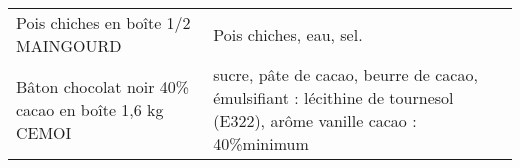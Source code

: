 \begin{longtable}{p{5cm}p{10cm}}
                                                                      Pois chiches en boîte 1/2 MAINGOURD &                                                                                                                                                                                                                                                                                                                                                                                                                                                                                                                                                                                                                                                                                                                                                                                                                                                                                                                                                                                                                  Pois chiches, eau, sel. \\
                                                      Bâton chocolat noir 40\% cacao en boîte 1,6 kg CEMOI &                                                                                                                                                                                                                                                                                                                                                                                                                                                                                                                                                                                                                                                                                                                                                                                                                                                                                                                    sucre, pâte de cacao, beurre de cacao, émulsifiant : lécithine de tournesol (E322), arôme vanille  cacao : 40\%minimum \\

\end{longtable}
